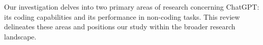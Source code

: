 



Our investigation delves into two primary areas of research concerning ChatGPT: its coding capabilities and its performance in non-coding tasks. This review delineates these areas and positions our study within the broader research landscape.


